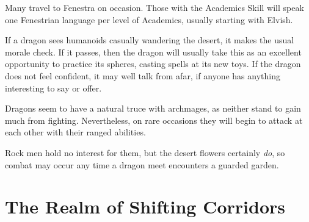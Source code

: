 \begin{multicols}{2}
\dragon

Many travel to Fenestra on occasion.
Those with the Academics Skill will speak one Fenestrian language per level of Academics, usually starting with Elvish.

If a dragon sees humanoids casually wandering the desert, it makes the usual morale check.
If it passes, then the dragon will usually take this as an excellent opportunity to practice its spheres, casting spells at its new toys.
If the dragon does not feel confident, it may well talk from afar, if anyone has anything interesting to say or offer.

Dragons seem to have a natural truce with archmages, as neither stand to gain much from fighting.
Nevertheless, on rare occasions they will begin to attack at each other with their ranged abilities.

Rock men hold no interest for them, but the desert flowers certainly \emph{do}, so combat may occur any time a dragon meet encounters a guarded garden.

\end{multicols}

\section{The Realm of Shifting Corridors}\label{shiftingcorridors}

